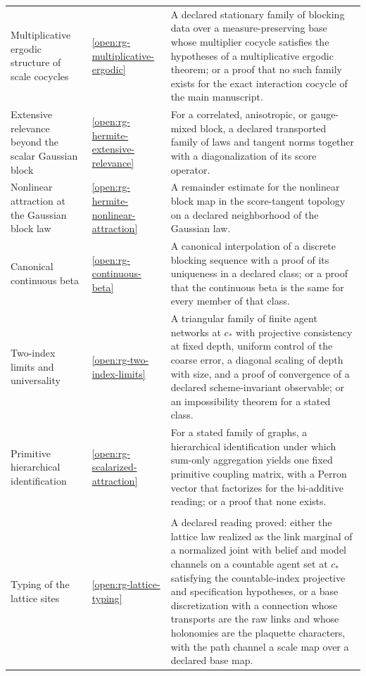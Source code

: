 {\begin{longtable}{@{}>{\raggedright\arraybackslash}p{}
>{\raggedright\arraybackslash}p{}
>{\raggedright\arraybackslash}p{}@{}}
Multiplicative ergodic structure of scale cocycles & \cref{open:rg-multiplicative-ergodic} & A declared stationary family of blocking data over a measure-preserving base whose multiplier cocycle satisfies the hypotheses of a multiplicative ergodic theorem; or a proof that no such family exists for the exact interaction cocycle of the main manuscript. \\
Extensive relevance beyond the scalar Gaussian block & \cref{open:rg-hermite-extensive-relevance} & For a correlated, anisotropic, or gauge-mixed block, a declared transported family of laws and tangent norms together with a diagonalization of its score operator. \\
Nonlinear attraction at the Gaussian block law & \cref{open:rg-hermite-nonlinear-attraction} & A remainder estimate for the nonlinear block map in the score-tangent topology on a declared neighborhood of the Gaussian law. \\
Canonical continuous beta & \cref{open:rg-continuous-beta} & A canonical interpolation of a discrete blocking sequence with a proof of its uniqueness in a declared class; or a proof that the continuous beta is the same for every member of that class. \\
Two-index limits and universality & \cref{open:rg-two-index-limits} & A triangular family of finite agent networks at $c_*$ with projective consistency at fixed depth, uniform control of the coarse error, a diagonal scaling of depth with size, and a proof of convergence of a declared scheme-invariant observable; or an impossibility theorem for a stated class. \\
Primitive hierarchical identification & \cref{open:rg-scalarized-attraction} & For a stated family of graphs, a hierarchical identification under which sum-only aggregation yields one fixed primitive coupling matrix, with a Perron vector that factorizes for the bi-additive reading; or a proof that none exists. \\
\multicolumn{3}{@{}l}{\textbf{Part B-III: the lattice cluster}} \\
Typing of the lattice sites & \cref{open:rg-lattice-typing} & A declared reading proved: either the lattice law realized as the link marginal of a normalized joint with belief and model channels on a countable agent set at $c_*$ satisfying the countable-index projective and specification hypotheses, or a base discretization with a connection whose transports are the raw links and whose holonomies are the plaquette characters, with the path channel a scale map over a declared base map. \\

\end{longtable}}
